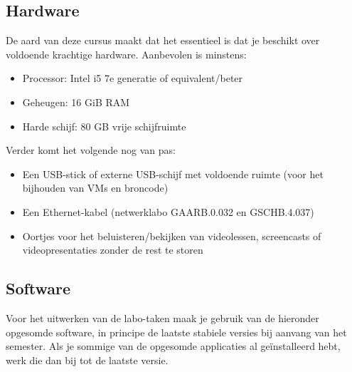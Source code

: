 \subsection{Hardware}%
\label{ssec:hardware}

De aard van deze cursus maakt dat het essentieel is dat je beschikt over voldoende krachtige hardware. Aanbevolen is minstens:

\begin{itemize}
  \item Processor: Intel i5 7e generatie of equivalent/beter
  \item Geheugen: 16 GiB RAM
  \item Harde schijf: 80 GB vrije schijfruimte
\end{itemize}

Verder komt het volgende nog van pas:

\begin{itemize}
  \item Een USB-stick of externe USB-schijf met voldoende ruimte (voor het bijhouden van VMs en broncode)
  \item Een Ethernet-kabel (netwerklabo GAARB.0.032 en GSCHB.4.037)
  \item Oortjes voor het beluisteren/bekijken van videolessen, screencasts of videopresentaties zonder de rest te storen
\end{itemize}

\subsection{Software}%
\label{ssec:software}

Voor het uitwerken van de labo-taken maak je gebruik van de hieronder opgesomde software, in principe de laatste stabiele versies bij aanvang van het semester. Als je sommige van de opgesomde applicaties al geïnstalleerd hebt, werk die dan bij tot de laatste versie.

